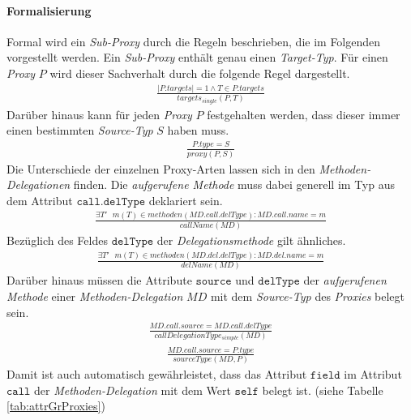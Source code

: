 \paragraph{Formalisierung}
Formal wird ein \emph{Sub-Proxy} durch die Regeln beschrieben, die im Folgenden vorgestellt werden. Ein \emph{Sub-Proxy} enthält genau einen \emph{Target-Typ}. Für einen \emph{Proxy} $P$ wird dieser Sachverhalt durch die folgende Regel dargestellt.
\begin{gather*}
\frac{|\mathit{P.targets}| = 1 \wedge T \in \mathit{P.targets}}{\mathit{targets_{single}(P,T)}}
\end{gather*}
\noindent
Darüber hinaus kann für jeden \emph{Proxy} $P$ festgehalten werden, dass dieser immer einen bestimmten \emph{Source-Typ} $S$ haben muss.
\begin{gather*}
\frac{\mathit{P.type} = \mathit{S}}{\mathit{proxy(P,S)}}
\end{gather*}
\noindent
Die Unterschiede der einzelnen Proxy-Arten lassen sich in den \emph{Methoden-Delegationen} finden. Die \emph{aufgerufene Methode} muss dabei generell im Typ aus dem Attribut $\texttt{call.delType}$ deklariert sein.
\begin{gather*}
\frac{\exists \mathit{T'\text{ } m(T)} \in \mathit{methoden(MD.call.delType)}: \mathit{MD.call.name} = m}
{\mathit{callName(MD)}}
\end{gather*}
\noindent
Bezüglich des Feldes $\texttt{delType}$ der \emph{Delegationsmethode} gilt ähnliches.
\begin{gather*}
\frac{\exists \mathit{T'\text{ }m(T)} \in \mathit{methoden(MD.del.delType)}: \mathit{MD.del.name} = m}
{\mathit{delName(MD)}}
\end{gather*}
\noindent
Darüber hinaus müssen die Attribute $\texttt{source}$ und $\texttt{delType}$ der \emph{aufgerufenen Methode} einer \emph{Methoden-Delegation} $\mathit{MD}$ mit dem \emph{Source-Typ} des \emph{Proxies} belegt sein.
\begin{gather*}
\frac{\mathit{MD.call.source} = \mathit{MD.call.delType}}
{\mathit{callDelegationType_{simple}(MD)}}
\end{gather*}
\begin{gather*}
\frac{\mathit{MD.call.source} = \mathit{P.type}}
{\mathit{sourceType(MD, P)}}
\end{gather*}
\noindent
Damit ist auch automatisch gewährleistet, dass das Attribut $\texttt{field}$ im Attribut $\texttt{call}$ der \emph{Methoden-Delegation} mit dem Wert $\texttt{self}$ belegt ist. (siehe Tabelle \ref{tab:attrGrProxies})

